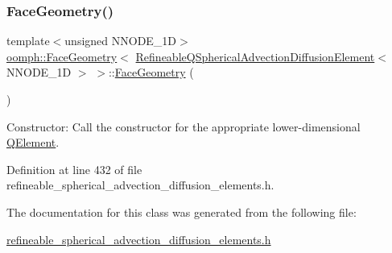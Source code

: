 \subsubsection{\texorpdfstring{Face\+Geometry()}{FaceGeometry()}}
{\footnotesize\ttfamily template$<$unsigned N\+N\+O\+D\+E\+\_\+1D$>$ \\
\hyperlink{classoomph_1_1FaceGeometry}{oomph\+::\+Face\+Geometry}$<$ \hyperlink{classoomph_1_1RefineableQSphericalAdvectionDiffusionElement}{Refineable\+Q\+Spherical\+Advection\+Diffusion\+Element}$<$ N\+N\+O\+D\+E\+\_\+1D $>$ $>$\+::\hyperlink{classoomph_1_1FaceGeometry}{Face\+Geometry} (\begin{DoxyParamCaption}{ }\end{DoxyParamCaption})\hspace{0.3cm}{\ttfamily [inline]}}



Constructor\+: Call the constructor for the appropriate lower-\/dimensional \hyperlink{classoomph_1_1QElement}{Q\+Element}. 



Definition at line 432 of file refineable\+\_\+spherical\+\_\+advection\+\_\+diffusion\+\_\+elements.\+h.



The documentation for this class was generated from the following file\+:\begin{DoxyCompactItemize}
\item 
\hyperlink{refineable__spherical__advection__diffusion__elements_8h}{refineable\+\_\+spherical\+\_\+advection\+\_\+diffusion\+\_\+elements.\+h}\end{DoxyCompactItemize}
